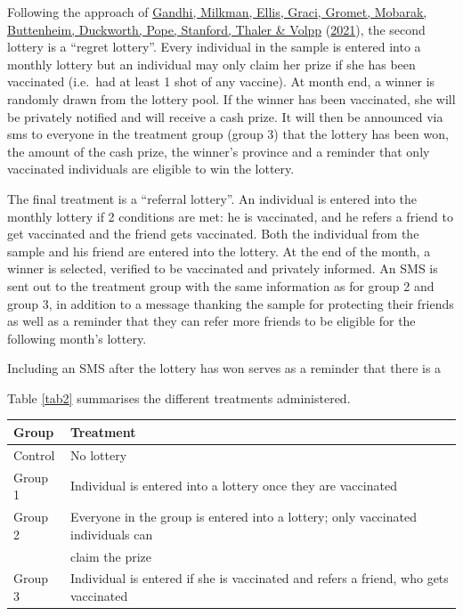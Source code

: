 \documentclass[11pt,preprint, authoryear]{elsarticle}
\let\origtable\table
\let\endorigtable\endtable
\renewenvironment{table}[1][2] {
    \expandafter\origtable\expandafter[H]
} {
    \endorigtable
}
\numberwithin{equation}{section}
\numberwithin{figure}{section}
\numberwithin{table}{section}
\begin{document}
Following the approach of \protect\hyperlink{ref-regret}{Gandhi,
Milkman, Ellis, Graci, Gromet, Mobarak, Buttenheim, Duckworth, Pope,
Stanford, Thaler \& Volpp} (\protect\hyperlink{ref-regret}{2021}), the
second lottery is a ``regret lottery''. Every individual in the sample
is entered into a monthly lottery but an individual may only claim her
prize if she has been vaccinated (i.e.~had at least 1 shot of any
vaccine). At month end, a winner is randomly drawn from the lottery
pool. If the winner has been vaccinated, she will be privately notified
and will receive a cash prize. It will then be announced via sms to
everyone in the treatment group (group 3) that the lottery has been won,
the amount of the cash prize, the winner's province and a reminder that
only vaccinated individuals are eligible to win the lottery.

The final treatment is a ``referral lottery''. An individual is entered
into the monthly lottery if 2 conditions are met: he is vaccinated, and
he refers a friend to get vaccinated and the friend gets vaccinated.
Both the individual from the sample and his friend are entered into the
lottery. At the end of the month, a winner is selected, verified to be
vaccinated and privately informed. An SMS is sent out to the treatment
group with the same information as for group 2 and group 3, in addition
to a message thanking the sample for protecting their friends as well as
a reminder that they can refer more friends to be eligible for the
following month's lottery.

Including an SMS after the lottery has won serves as a reminder that
there is a

Table \ref{tab2} summarises the different treatments administered.

\begin{table}[H]
\centering
\begin{tabular}{ll}
  \toprule
Group & Treatment \\ 
  \midrule
Control & No lottery \\ 
  Group 1 & Individual is entered into a lottery once they are vaccinated \\ 
  Group 2 & Everyone in the group is entered into a lottery; only vaccinated individuals can \\ 
   & claim the prize \\ 
  Group 3 & Individual is entered if she is vaccinated and refers a friend, who gets vaccinated \\ 
   \bottomrule
\end{tabular}
\caption{Treatment Summary \label{tab2}} 
\end{table}
\end{document}
